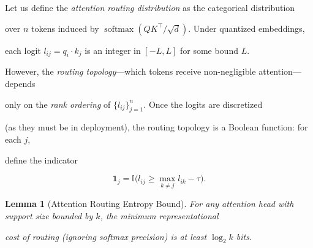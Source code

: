 \documentclass[11pt]{article}
\newtheorem{lemma}[theorem]{Lemma}
\theoremstyle{definition}
\newcommand{\softmax}{\operatorname{softmax}}
\begin{document}
Let us define the \emph{attention routing distribution} as the categorical distribution





over $n$ tokens induced by $\softmax(QK^\top / \sqrt{d})$. Under quantized embeddings,





each logit $l_{ij} = q_i \cdot k_j$ is an integer in $[-L, L]$ for some bound $L$.











However, the \emph{routing topology}---which tokens receive non-negligible attention---depends





only on the \emph{rank ordering} of $\{l_{ij}\}_{j=1}^n$. Once the logits are discretized





(as they must be in deployment), the routing topology is a Boolean function: for each $j$,





define the indicator





\[





\mathbf{1}_j = \mathbb{I}\bigl(l_{ij} \geq \max_{k \neq j} l_{ik} - \tau\bigr).





\]











\begin{lemma}[Attention Routing Entropy Bound]





For any attention head with support size bounded by $k$, the minimum representational





cost of routing (ignoring softmax precision) is at least $\log_2 k$ bits.





\end{lemma}
\end{document}
